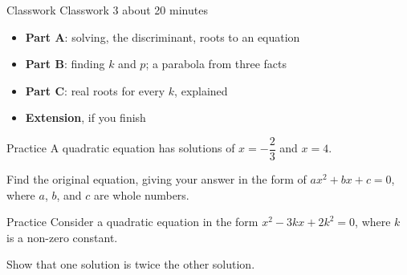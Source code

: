 \documentclass[aspectratio=169,11pt,xcolor=table,t]{beamer}
\begin{document}
\begin{frame}{Classwork}
\relax
Classwork 3 \textperiodcentered{} about 20 minutes
\begin{itemize}
\item \textbf{Part A}: solving, the discriminant, roots to an equation
\item \textbf{Part B}: finding $k$ and $p$; a parabola from three facts
\item \textbf{Part C}: real roots for every $k$, explained
\item \textbf{Extension}, if you finish
\end{itemize}
\end{frame}

\begin{frame}{Practice}
\relax
{} A quadratic equation has solutions of $x = -\dfrac{2}{3}$ and $x = 4$.\par\smallskip
Find the original equation, giving your answer in the form of $ax^{2} + bx + c = 0$, where $a$, $b$, and $c$ are whole numbers.
\end{frame}

\begin{frame}{Practice}
\relax
{} Consider a quadratic equation in the form $x^{2} - 3kx + 2k^{2} = 0$, where $k$ is a non-zero constant.\par\smallskip
Show that one solution is twice the other solution.
\end{frame}
\end{document}
